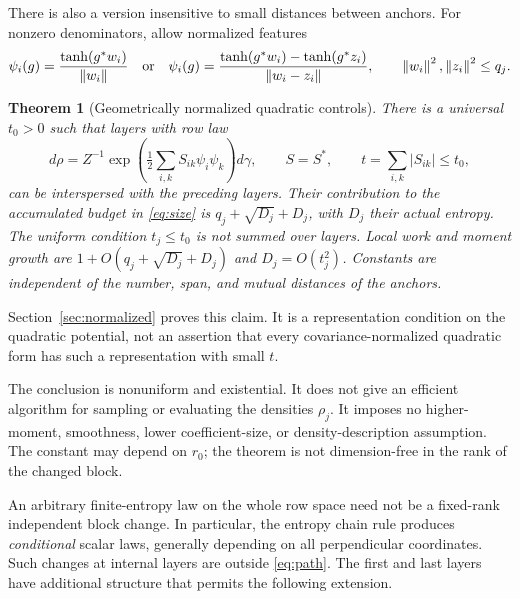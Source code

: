 \documentclass[11pt]{article}
\newtheorem{theorem}{Theorem}
\newcommand{\norm}[1]{\left\lVert #1\right\rVert}
\begin{document}
There is also a version insensitive to small distances between anchors. For nonzero denominators, allow normalized features
\[
 \psi_i(g)=\frac{\tanh(g^*w_i)}{\norm{w_i}}
 \quad\hbox{or}\quad
 \psi_i(g)=\frac{\tanh(g^*w_i)-\tanh(g^*z_i)}{\norm{w_i-z_i}},
 \qquad \norm{w_i}^2,\norm{z_i}^2\le q_j.
\]
\begin{theorem}[Geometrically normalized quadratic controls]
\label{thm:normalized}
There is a universal $t_0>0$ such that layers with row law
\[
 d\rho=Z^{-1}\exp\left(\tfrac12\sum_{i,k}S_{ik}\psi_i\psi_k\right)d\gamma,
 \qquad S=S^*,\qquad t=\sum_{i,k}|S_{ik}|\le t_0,
\]
can be interspersed with the preceding layers. Their contribution to the accumulated budget in \eqref{eq:size} is $q_j+\sqrt{D_j}+D_j$, with $D_j$ their actual entropy. The uniform condition $t_j\le t_0$ is not summed over layers. Local work and moment growth are $1+O(q_j+\sqrt{D_j}+D_j)$ and $D_j=O(t_j^2)$. Constants are independent of the number, span, and mutual distances of the anchors.
\end{theorem}
Section~\ref{sec:normalized} proves this claim. It is a representation condition on the quadratic potential, not an assertion that every covariance-normalized quadratic form has such a representation with small $t$.

The conclusion is nonuniform and existential. It does not give an efficient algorithm for sampling or evaluating the densities $\rho_j$. It imposes no higher-moment, smoothness, lower coefficient-size, or density-description assumption. The constant may depend on $r_0$; the theorem is not dimension-free in the rank of the changed block.

An arbitrary finite-entropy law on the whole row space need not be a fixed-rank independent block change. In particular, the entropy chain rule produces \emph{conditional} scalar laws, generally depending on all perpendicular coordinates. Such changes at internal layers are outside \eqref{eq:path}. The first and last layers have additional structure that permits the following extension.
\end{document}
